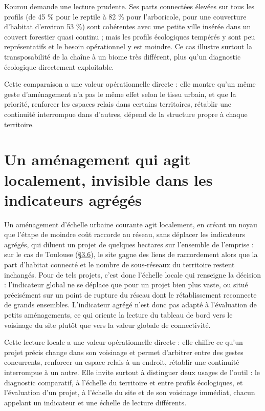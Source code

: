 \documentclass[a4paper,11pt]{report}
\begin{document}
Kourou demande une lecture prudente. Ses parts connectées élevées sur tous les profils (de 45 \% pour le reptile à 82 \% pour l'arboricole, pour une couverture d'habitat d'environ 53 \%) sont cohérentes avec une petite ville insérée dans un couvert forestier quasi continu ; mais les profils écologiques tempérés y sont peu représentatifs et le besoin opérationnel y est moindre. Ce cas illustre surtout la transposabilité de la chaîne à un biome très différent, plus qu'un diagnostic écologique directement exploitable.

Cette comparaison a une valeur opérationnelle directe : elle montre qu'un même geste d'aménagement n'a pas le même effet selon le tissu urbain, et que la priorité, renforcer les espaces relais dans certains territoires, rétablir une continuité interrompue dans d'autres, dépend de la structure propre à chaque territoire.

\section{Un aménagement qui agit localement, invisible dans les indicateurs agrégés}\label{sec:4.3}

Un aménagement d'échelle urbaine courante agit localement, en créant un noyau que l'étape de moindre coût raccorde au réseau, sans déplacer les indicateurs agrégés, qui diluent un projet de quelques hectares sur l'ensemble de l'emprise : sur le cas de Toulouse (\hyperref[sec:3.6]{§3.6}), le site gagne des liens de raccordement alors que la part d'habitat connecté et le nombre de sous-réseaux du territoire restent inchangés. Pour de tels projets, c'est donc l'échelle locale qui renseigne la décision : l'indicateur global ne se déplace que pour un projet bien plus vaste, ou situé précisément sur un point de rupture du réseau dont le rétablissement reconnecte de grands ensembles. L'indicateur agrégé n'est donc pas adapté à l'évaluation de petits aménagements, ce qui oriente la lecture du tableau de bord vers le voisinage du site plutôt que vers la valeur globale de connectivité.

Cette lecture locale a une valeur opérationnelle directe : elle chiffre ce qu'un projet précis change dans son voisinage et permet d'arbitrer entre des gestes concurrents, renforcer un espace relais à un endroit, rétablir une continuité interrompue à un autre. Elle invite surtout à distinguer deux usages de l'outil : le diagnostic comparatif, à l'échelle du territoire et entre profils écologiques, et l'évaluation d'un projet, à l'échelle du site et de son voisinage immédiat, chacun appelant un indicateur et une échelle de lecture différents.
\end{document}
